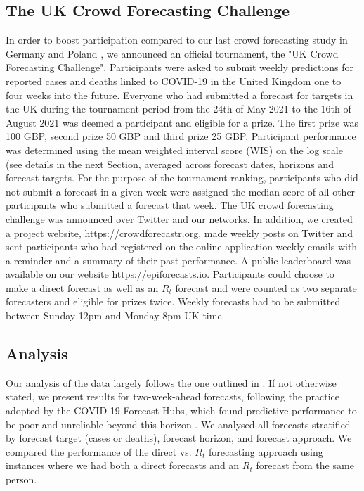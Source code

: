 \documentclass[10pt,a4paper,twocolumn]{article}
\begin{document}
\subsection*{The UK Crowd Forecasting Challenge}

In order to boost participation compared to our last crowd forecasting study in Germany and Poland \citep{bosseComparingHumanModelbased2022}, we announced an official tournament, the "UK Crowd Forecasting Challenge". Participants were asked to submit weekly predictions for reported cases and deaths linked to COVID-19 in the United Kingdom one to four weeks into the future. Everyone who had submitted a forecast for targets in the UK during the tournament period from the 24th of May 2021 to the 16th of August 2021 was deemed a participant and eligible for a prize. The first prize was 100 GBP, second prize 50 GBP and third prize 25 GBP. Participant performance was determined using the mean weighted interval score (WIS) on the log scale (see details in the next Section, %
averaged across forecast dates, horizons and forecast targets. For the purpose of the tournament ranking, participants who did not submit a forecast in a given week were assigned the median score of all other participants who submitted a forecast that week. The UK crowd forecasting challenge was announced over Twitter and our networks. 
In addition, we created a project website, \url{https://crowdforecastr.org}, made weekly posts on Twitter and sent participants who had registered on the online application weekly emails with a reminder and a summary of their past performance. A public leaderboard was available on our website \url{https://epiforecasts.io}. Participants could choose to make a direct forecast as well as an $R_t$ forecast and were counted as two separate forecasters and eligible for prizes twice. Weekly forecasts had to be submitted between Sunday 12pm and Monday 8pm UK time. 


\subsection*{Analysis}
\label{sec:analysis}

Our analysis of the data largely follows the one outlined in \citet{bosseComparingHumanModelbased2022}. If not otherwise stated, we present results for two-week-ahead forecasts, following the practice adopted by the COVID-19 Forecast Hubs, which found predictive performance to be poor and unreliable beyond this horizon \cite{cramerEvaluationIndividualEnsemble2021, sherrattPredictivePerformanceMultimodel2022a, bracherShorttermForecastingCOVID192021}. We analysed all forecasts stratified by forecast target (cases or deaths), forecast horizon, and forecast approach. We compared the performance of the direct vs. $R_t$ forecasting approach using instances where we had both a direct forecasts and an $R_t$ forecast from the same person. 
\end{document}
